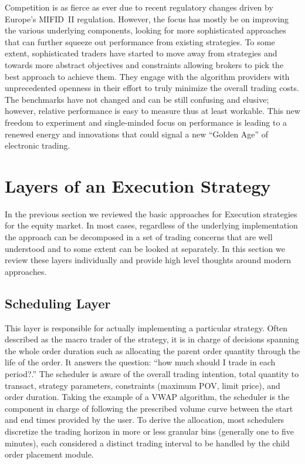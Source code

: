 Competition is as fierce as ever due to recent regulatory changes driven by Europe's MIFID~II regulation. However, the focus has mostly be on improving the various underlying components, looking for more sophisticated approaches that can further squeeze out performance from existing strategies. To some extent, sophisticated traders have started to move away from strategies and towards more abstract objectives and constraints allowing brokers to pick the best approach to achieve them. They engage with the algorithm providers with unprecedented openness in their effort to truly minimize the overall trading costs. The benchmarks have not changed and can be still confusing and elusive; however, relative performance is easy to measure thus at least workable. This new freedom to experiment and single-minded focus on performance is leading to a renewed energy and innovations that could signal a new ``Golden Age'' of electronic trading.



\section{Layers of an Execution Strategy}

In the previous section we reviewed the basic approaches for Execution strategies for the equity market. In most cases, regardless of the underlying implementation the approach can be decomposed in a set of trading concerns that are well understood and to some extent can be looked at separately. In this section we review these layers individually and provide high level thoughts around modern approaches.



\subsection{Scheduling Layer}

This layer is responsible for actually implementing a particular strategy. Often described as the macro trader of the strategy, it is in charge of decisions spanning the whole order duration such as allocating the parent order quantity through the life of the order. It answers the question: ``how much should I trade in each period?.'' The scheduler is aware of the overall trading intention, total quantity to transact, strategy parameters, constraints (maximum POV, limit price), and order duration. Taking the example of a VWAP algorithm, the scheduler is the component in charge of following the prescribed volume curve between the start and end times provided by the user. To derive the allocation, most schedulers discretize the trading horizon in more or less granular bins (generally one to five minutes), each considered a distinct trading interval to be handled by the child order placement module.


